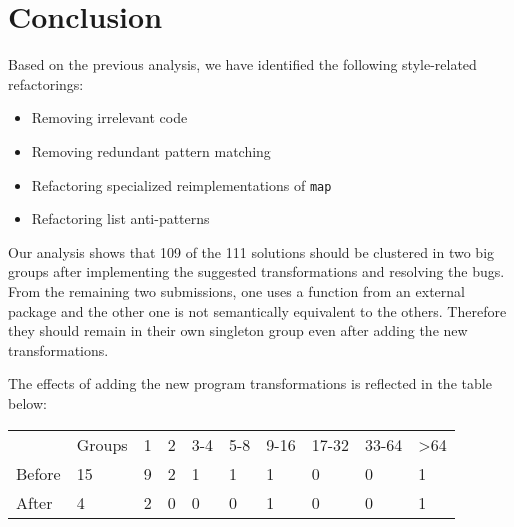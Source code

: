 \section{Conclusion}

Based on the previous analysis, we have identified the following style-related refactorings:

\begin{itemize}
    \item Removing irrelevant code
    \item Removing redundant pattern matching
    \item Refactoring specialized reimplementations of \texttt{map}
    \item Refactoring list anti-patterns
\end{itemize}

Our analysis shows that 109 of the 111 solutions should be clustered in two big groups after implementing the suggested transformations and resolving the bugs. From the remaining two submissions, one uses a function from an external package and the other one is not semantically equivalent to the others. Therefore they should remain in their own singleton group even after adding the new transformations.

The effects of adding the new program transformations is reflected in the table below:

\begin{tabular}{l l l l l l l l l l}
             & Groups & 1     & 2   & 3-4 & 5-8 & 9-16 & 17-32 & 33-64 & >64 \\
    Before   & 15     & 9     & 2   & 1   & 1   &  1   & 0     & 0     & 1   \\
    After    & 4      & 2     & 0   & 0   & 0   &  1   & 0     & 0     & 1
\end{tabular}
